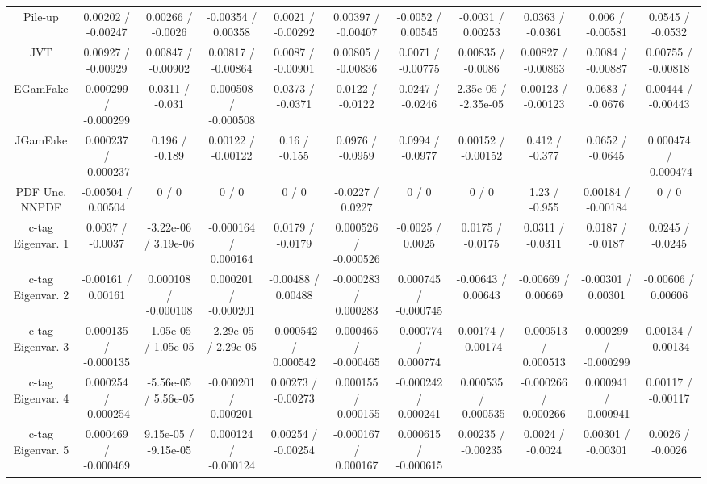 \begin{table}[htbp]
\begin{center}
\begin{tabular}{|c|c|c|c|c|c|c|c|c|c|c|}
  Pile-up & 0.00202 / -0.00247 & 0.00266 / -0.0026 & -0.00354 / 0.00358 & 0.0021 / -0.00292 & 0.00397 / -0.00407 & -0.0052 / 0.00545 & -0.0031 / 0.00253 & 0.0363 / -0.0361 & 0.006 / -0.00581 & 0.0545 / -0.0532 \\ 
  JVT & 0.00927 / -0.00929 & 0.00847 / -0.00902 & 0.00817 / -0.00864 & 0.0087 / -0.00901 & 0.00805 / -0.00836 & 0.0071 / -0.00775 & 0.00835 / -0.0086 & 0.00827 / -0.00863 & 0.0084 / -0.00887 & 0.00755 / -0.00818 \\ 
  EGamFake & 0.000299 / -0.000299 & 0.0311 / -0.031 & 0.000508 / -0.000508 & 0.0373 / -0.0371 & 0.0122 / -0.0122 & 0.0247 / -0.0246 & 2.35e-05 / -2.35e-05 & 0.00123 / -0.00123 & 0.0683 / -0.0676 & 0.00444 / -0.00443 \\ 
  JGamFake & 0.000237 / -0.000237 & 0.196 / -0.189 & 0.00122 / -0.00122 & 0.16 / -0.155 & 0.0976 / -0.0959 & 0.0994 / -0.0977 & 0.00152 / -0.00152 & 0.412 / -0.377 & 0.0652 / -0.0645 & 0.000474 / -0.000474 \\ 
  PDF Unc. NNPDF & -0.00504 / 0.00504 & 0 / 0 & 0 / 0 & 0 / 0 & -0.0227 / 0.0227 & 0 / 0 & 0 / 0 & 1.23 / -0.955 & 0.00184 / -0.00184 & 0 / 0 \\ 
  c-tag Eigenvar. 1 & 0.0037 / -0.0037 & -3.22e-06 / 3.19e-06 & -0.000164 / 0.000164 & 0.0179 / -0.0179 & 0.000526 / -0.000526 & -0.0025 / 0.0025 & 0.0175 / -0.0175 & 0.0311 / -0.0311 & 0.0187 / -0.0187 & 0.0245 / -0.0245 \\ 
  c-tag Eigenvar. 2 & -0.00161 / 0.00161 & 0.000108 / -0.000108 & 0.000201 / -0.000201 & -0.00488 / 0.00488 & -0.000283 / 0.000283 & 0.000745 / -0.000745 & -0.00643 / 0.00643 & -0.00669 / 0.00669 & -0.00301 / 0.00301 & -0.00606 / 0.00606 \\ 
  c-tag Eigenvar. 3 & 0.000135 / -0.000135 & -1.05e-05 / 1.05e-05 & -2.29e-05 / 2.29e-05 & -0.000542 / 0.000542 & 0.000465 / -0.000465 & -0.000774 / 0.000774 & 0.00174 / -0.00174 & -0.000513 / 0.000513 & 0.000299 / -0.000299 & 0.00134 / -0.00134 \\ 
  c-tag Eigenvar. 4 & 0.000254 / -0.000254 & -5.56e-05 / 5.56e-05 & -0.000201 / 0.000201 & 0.00273 / -0.00273 & 0.000155 / -0.000155 & -0.000242 / 0.000241 & 0.000535 / -0.000535 & -0.000266 / 0.000266 & 0.000941 / -0.000941 & 0.00117 / -0.00117 \\ 
  c-tag Eigenvar. 5 & 0.000469 / -0.000469 & 9.15e-05 / -9.15e-05 & 0.000124 / -0.000124 & 0.00254 / -0.00254 & -0.000167 / 0.000167 & 0.000615 / -0.000615 & 0.00235 / -0.00235 & 0.0024 / -0.0024 & 0.00301 / -0.00301 & 0.0026 / -0.0026 \\ 

\end{tabular}
\end{center}
\end{table}

